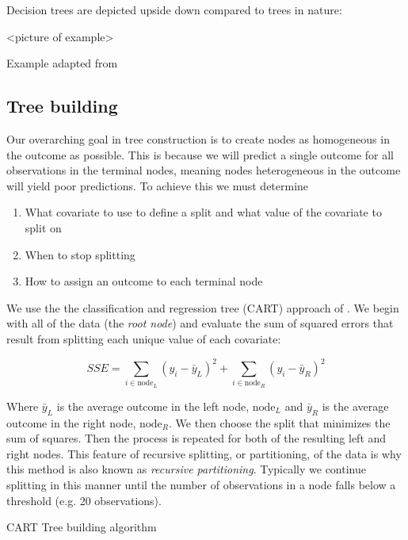 \documentclass[12pt]{article}
\begin{document}
Decision trees are depicted upside down compared to trees in nature:

<picture of example>

Example adapted from \cite{kuhn}

\subsection{Tree building} %
\label{sub:tree_building}

Our overarching goal in tree construction is to create nodes as homogeneous in the outcome as possible. This is because we will predict a single outcome for all observations in the terminal nodes, meaning nodes heterogeneous in the outcome will yield poor predictions. To achieve this we must determine

\begin{enumerate}
  \item What covariate to use to define a split and what value of the covariate to split on
  \item When to stop splitting
  \item How to assign an outcome to each terminal node
\end{enumerate}

We use the the classification and regression tree (CART) approach of \cite{CART}. We begin with all of the data (the \emph{root node}) and evaluate the sum of squared errors that result from splitting each unique value of each covariate:

\begin{equation}
  SSE = \sum_{i \in \text{node}_{L}} (y_{i} - \bar{y}_{L})^2 + \sum_{i \in \text{node}_{R}} (y_{i} - \bar{y}_{R})^2 
\end{equation} 

Where $\bar{y}_{L}$ is the average outcome in the left node, $\text{node}_{L}$ and $\bar{y}_{R}$ is the average outcome in the right node, $\text{node}_{R}$. We then choose the split that minimizes the sum of squares. Then the process is repeated for both of the resulting left and right nodes. This feature of recursive splitting, or partitioning, of the data is why this method is also known as \emph{recursive partitioning}. Typically we continue splitting in this manner until the number of observations in a node falls below a threshold (e.g. 20 observations).

\begin{algorithm}[H]
 \caption{CART Tree building algorithm}
\end{algorithm}
\end{document}
